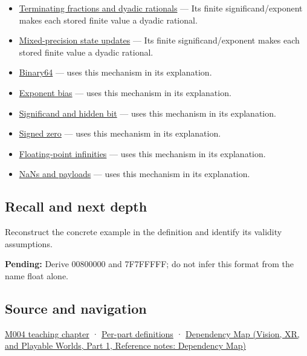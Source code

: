 \begin{itemize}
\item
  \hyperref[appendix-2a2f1b74bdd3]{Terminating fractions and dyadic rationals} --- Its finite significand/exponent makes each stored finite value a dyadic rational.
\item
  \hyperref[appendix-260182e617b7]{Mixed-precision state updates} --- Its finite significand/exponent makes each stored finite value a dyadic rational.
\item
  \hyperref[appendix-5078dfab64e6]{Binary64} --- uses this mechanism in its explanation.
\item
  \hyperref[appendix-2fae058c82e1]{Exponent bias} --- uses this mechanism in its explanation.
\item
  \hyperref[appendix-a24fd710cf67]{Significand and hidden bit} --- uses this mechanism in its explanation.
\item
  \hyperref[appendix-3a048f032c1f]{Signed zero} --- uses this mechanism in its explanation.
\item
  \hyperref[appendix-eb336149c00a]{Floating-point infinities} --- uses this mechanism in its explanation.
\item
  \hyperref[appendix-d6607cc4c235]{NaNs and payloads} --- uses this mechanism in its explanation.
\end{itemize}

\subsection{Recall and next depth}\label{appendix-5057f9ad327f-recall-and-next-depth}

\hypertarget{appendix-5057f9ad327f-recall-and-next-depth}{}

Reconstruct the concrete example in the definition and identify its validity assumptions.

\textbf{Pending:} Derive 00800000 and 7F7FFFFF; do not infer this format from the name float alone.

\subsection{Source and navigation}\label{appendix-5057f9ad327f-source-and-navigation}

\hypertarget{appendix-5057f9ad327f-source-and-navigation}{}

\hyperref[01-foundations-i-ch001-a-stretching-ruler-for-real-valued-quantities]{M004 teaching chapter} · \hyperref[appendix-fd090d982a15-m004---parts-61-76]{Per-part definitions} · \href{../07-Vision-XR-and-Playable-Worlds-P01/main.pdf\#appendix-4ad47bdd269a}{Dependency Map (Vision, XR, and Playable Worlds, Part 1, Reference notes: Dependency Map)}
